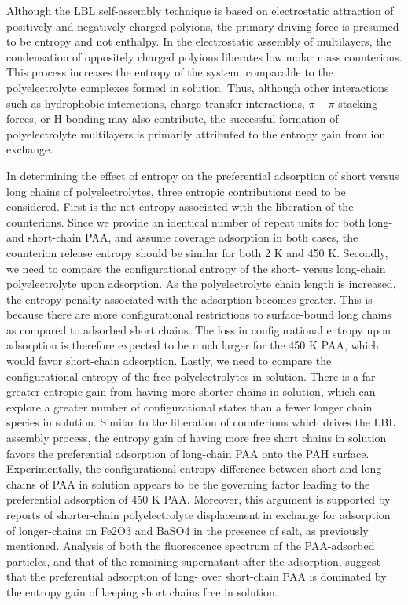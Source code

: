 \documentclass[journal=mamobx,manuscript=article]{achemso}
\begin{document}
Although the LBL self-assembly technique is based on electrostatic attraction of positively and negatively charged polyions, the primary driving force is presumed to be entropy and not enthalpy.  In the electrostatic assembly of multilayers, the condensation of oppositely charged polyions liberates low molar mass counterions.  This process increases the entropy of the system, comparable to the polyelectrolyte complexes formed in solution.\cite{Kabanov1994,Philipp1989}  Thus, although other interactions such as hydrophobic interactions, charge transfer interactions, $\pi-\pi$ stacking forces, or H-bonding may also contribute, the successful formation of polyelectrolyte multilayers is primarily attributed to the entropy gain from ion 
exchange.\cite{Kotov1999,Bertrand2000}  

In determining the effect of entropy on the preferential adsorption of short versus long chains of polyelectrolytes, three entropic contributions need to be considered.  First is the net entropy associated with the liberation of the counterions.  Since we provide an identical number of repeat units for both long- and short-chain PAA, and assume coverage adsorption in both cases, the counterion release entropy should be similar for both 2 K and 450 K.  Secondly, we need to compare the configurational entropy of the short- versus long-chain polyelectrolyte upon adsorption.  As the polyelectrolyte chain length is increased, the entropy penalty associated with the adsorption becomes greater.  This is because there are more configurational restrictions to surface-bound long chains as compared to adsorbed short chains.  The loss in configurational entropy upon adsorption is therefore expected to be much larger for the 450 K PAA, which would favor short-chain adsorption.  Lastly, we need to compare the configurational entropy of the free polyelectrolytes in solution.  There is a far greater entropic gain from having more shorter chains in solution, which can explore a greater number of configurational states than a fewer longer chain species in solution.  Similar to the liberation of counterions which drives the LBL assembly process, the entropy gain of having more free short chains in solution favors the preferential adsorption of long-chain PAA onto the PAH surface.  Experimentally, the configurational entropy difference between short and long-chains of PAA in solution appears to be the governing factor leading to the preferential adsorption of 450 K PAA.  Moreover, this argument is supported by reports of shorter-chain polyelectrolyte displacement in exchange for adsorption of longer-chains on Fe2O3 and BaSO4 in the presence of salt, as previously mentioned.\cite{DeLaat1995}  Analysis of both the fluorescence spectrum of the PAA-adsorbed particles, and that of the remaining supernatant after the adsorption, suggest that the preferential adsorption of long- over short-chain PAA is dominated by the entropy gain of keeping short chains free in solution.
\end{document}

